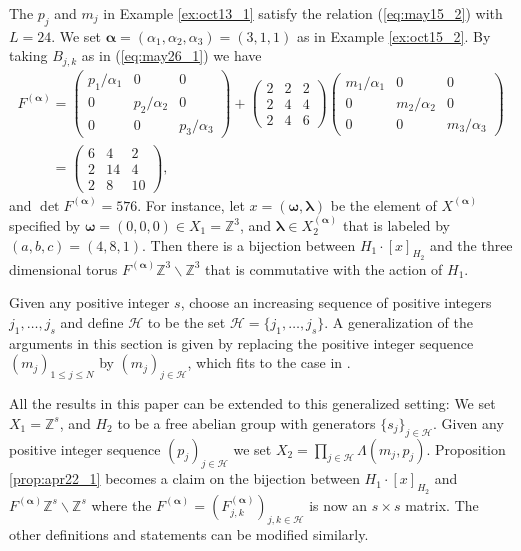 \documentclass[pdftex]{sigma}
\newcommand{\Z}{{\mathbb Z}}
\newcommand\bom{\boldsymbol{\omega}}
\newcommand\bol{\boldsymbol{\lambda}}
\newcommand\boa{\boldsymbol{\alpha}}
\renewcommand{\H}{{\mathcal H}}
\begin{document}
\begin{example}\label{ex:oct15_4}
The $p_j$ and $m_j$ in Example \ref{ex:oct13_1} satisfy the relation (\ref{eq:may15_2}) with $L=24$.
We set $\boa = (\alpha_1, \alpha_2, \alpha_3) = (3,1,1)$ as in Example \ref{ex:oct15_2}.
By taking $B_{j,k}$ as in (\ref{eq:may26_1}) we have
\begin{gather*}
F^{(\boa)}  =
\begin{pmatrix}
p_1/\alpha_1  & 0 & 0 \\
0 &  p_2/\alpha_2  & 0 \\
0 & 0 &   p_3/\alpha_3
\end{pmatrix}
+
\begin{pmatrix}
2 & 2 & 2 \\
2 & 4 & 4 \\
2 & 4 & 6
\end{pmatrix}
\begin{pmatrix}
m_1/\alpha_1   & 0 & 0 \\
0 &  m_2/\alpha_2  & 0 \\
0 & 0 &   m_3/\alpha_3
\end{pmatrix}\\
\phantom{F^{(\boa)}}{}
 =
\begin{pmatrix}
6 & 4 & 2 \\
2 & 14 & 4 \\
2 & 8 & 10
\end{pmatrix}
,
\end{gather*}
and $\det F^{(\boa)} = 576$.
For instance, let $x = (\bom, \bol)$ be the element of $X^{(\boa)}$ specif\/ied by
$\bom = (0,0,0) \in X_1 = \Z^3$, and
$\bol \in X_2^{(\boa)}$ that is labeled by $(a,b,c) = (4,8,1)$.
Then there is a bijection between $H_1 \cdot [x]_{H_2}$ and
the three dimensional torus $F^{(\boa)} \Z^3 \backslash \Z^3$ that is commutative with the action of $H_1$.
\end{example}

%
\begin{remark}\label{rem:mar12_1}
Given any positive integer $s$, choose an increasing sequence of positive integers $j_1, \ldots ,j_s$
and def\/ine $\H$ to be the set $\H=\{j_1,\ldots,j_s\}$.
{A generalization of the arguments in this section is given by} replacing the positive integer sequence $(m_j)_{1 \leq j \leq N}$ by
$(m_j)_{j \in \H}$, which f\/its to the case in \cite{KTT}.

All the results in this paper can be extended to this generalized setting:
We set $X_1 = \Z^s$, and
$H_2$ to be a free abelian group with generators $\{ s_j \}_{j \in \H}$.
Given any {positive} integer sequence $(p_j)_{j \in \H}$
we set $X_2 = \prod_{j \in \H} \Lambda (m_j,p_j)$.
Proposition \ref{prop:apr22_1} becomes a claim on the bijection between
$H_1 \cdot [x]_{H_2}$ and $F^{(\boa)} \Z^s \backslash \Z^s$ where
the $F^{(\boa)}= (F^{(\boa)}_{j,k})_{j,k \in \H}$ is now an $s \times s$ matrix.
%
The other def\/initions and statements can be modif\/ied similarly.

\end{remark}
\end{document}
